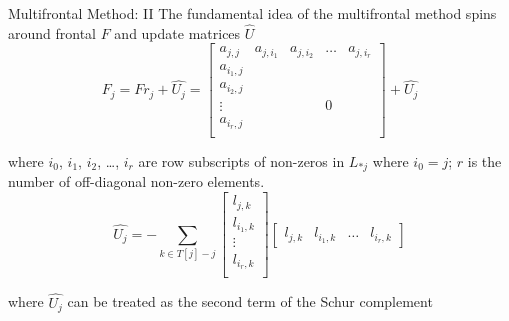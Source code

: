 \begin{frame}[t]{Multifrontal Method: II}
	\small
	\justifying
	The fundamental idea of the multifrontal method spins around frontal $F$ and update matrices $\hat{U}$
	\begin{equation} \label{eq:mm-1}
		F_{j} = Fr_{j} + \hat{U_{j}} = \begin{bmatrix}a_{j,j} & a_{j,i_1} & a_{j,i_2} & \dots & a_{j,i_r} \\
		a_{i_1,j} \\
		a_{i_2,j} \\
		\vdots & & & 0\\
		a_{i_r,j} \\
		\end{bmatrix} + \hat{U_{j}}
	\end{equation}
	
	where $i_{0}$, $i_{1}$, $i_{2}$, \dots , $i_{r}$ are row subscripts of non-zeros in $L_{*j}$ where $i_{0} = j$; $r$ is the number of off-diagonal non-zero elements.\\


	\begin{equation} \label{eq:mm-2}
		\hat{U_{j}} = - \sum_{k \in T[j] -{j}}  \begin{bmatrix}
		l_{j,k} \\
		l_{i_1,k} \\
		\vdots \\
		l_{i_r,k} \\
		\end{bmatrix} \begin{bmatrix}
		l_{j,k} & l_{i_1,k} & \dots & l_{i_r,k}
		\end{bmatrix} 
	\end{equation}
	
	where $\hat{U_{j}}$ can be treated as the second term of the Schur complement
	
\end{frame}


